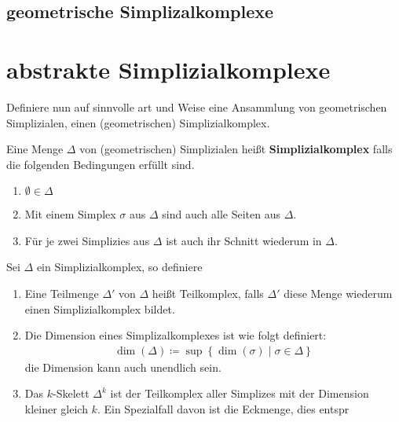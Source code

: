 \subsection{geometrische Simplizalkomplexe}


\section{abstrakte Simplizialkomplexe}

Definiere nun auf sinnvolle art und Weise eine Ansammlung von
geometrischen Simplizialen, einen (geometrischen) Simplizialkomplex.

\begin{Def}
  Eine Menge $\Delta$ von (geometrischen) Simplizialen heißt
  \textbf{Simplizialkomplex} falls die folgenden Bedingungen erfüllt
  sind.
  \begin{enumerate}[1)]
  \item $\emptyset \in \Delta$
  \item Mit einem Simplex $\sigma$ aus $\Delta$ sind auch alle Seiten
    aus $\Delta$.
  \item Für je zwei Simplizies aus $\Delta$ ist auch ihr Schnitt
    wiederum in $\Delta$.
  \end{enumerate}
\end{Def}


\begin{Def}
  Sei $\Delta$ ein Simplizialkomplex, so definiere
  \begin{enumerate}[1)]
  \item Eine Teilmenge $\Delta'$ von $\Delta$ heißt Teilkomplex, falls
    $\Delta'$ diese Menge wiederum einen Simplizialkomplex bildet.
  \item Die Dimension eines Simplizalkomplexes ist wie folgt
    definiert:
    \begin{gather*}
      \dim(\Delta) \coloneqq \sup \left\{ \dim(\sigma) \; \Big| \;
        \sigma \in \Delta \right\}
    \end{gather*}
    die Dimension kann auch unendlich sein.
  \item Das $k$-Skelett $\Delta^k$ ist der Teilkomplex aller Simplizes
    mit der Dimension kleiner gleich $k$.  Ein Spezialfall davon ist
    die Eckmenge, dies entspr
  \end{enumerate}
\end{Def}


